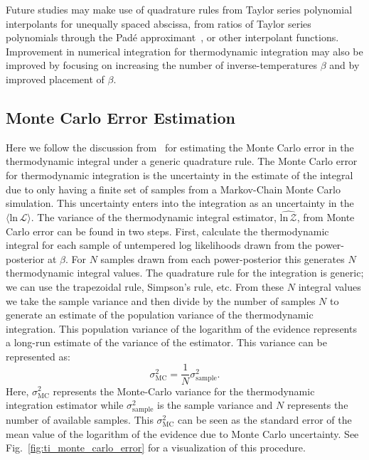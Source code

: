 Future studies may make use of quadrature rules from Taylor series polynomial interpolants for unequally spaced abscissa, from ratios of Taylor series polynomials through the Pad$\textrm{\'e}$ approximant~\citep{press1992pade}, or other interpolant functions. Improvement in numerical integration for thermodynamic integration may also be improved by focusing on increasing the number of inverse-temperatures $\beta$ and by improved placement of $\beta$.

\subsection{Monte Carlo Error Estimation}
Here we follow the discussion from~\cite{annis2019thermodynamic} for estimating the Monte Carlo error in the thermodynamic integral under a generic quadrature rule. The Monte Carlo error for thermodynamic integration is the uncertainty in the estimate of the integral due to only having a finite set of samples from a Markov-Chain Monte Carlo simulation. This uncertainty enters into the integration as an uncertainty in the $\langle \mathrm{ln} \, \mathcal{L} \rangle$. The variance of the thermodynamic integral estimator, $\widehat{\mathrm{ln} \, \mathcal{Z}}$, from Monte Carlo error can be found in two steps. First, calculate the thermodynamic integral for each sample of untempered log likelihoods drawn from the power-posterior at $\beta$. For $N$ samples drawn from each power-posterior this generates $N$ thermodynamic integral values. The quadrature rule for the integration is generic; we can use the trapezoidal rule, Simpson's rule, etc. From these $N$ integral values we take the sample variance and then divide by the number of samples $N$ to generate an estimate of the population variance of the thermodynamic integration. This population variance of the logarithm of the evidence represents a long-run estimate of the variance of the estimator. This variance can be represented as:
\begin{equation}
    \sigma^2_{\mathrm{MC}} = \frac{1}{N} \sigma^2_{\mathrm{sample}}.
\end{equation}
Here, $\sigma^2_{\mathrm{MC}}$ represents the Monte-Carlo variance for the thermodynamic integration estimator while $\sigma^2_{\mathrm{sample}}$ is the sample variance and $N$ represents the number of available samples. This $\sigma^2_{\mathrm{MC}}$ can be seen as the standard error of the mean value of the logarithm of the evidence due to Monte Carlo uncertainty. See Fig.~\ref{fig:ti_monte_carlo_error} for a visualization of this procedure.

